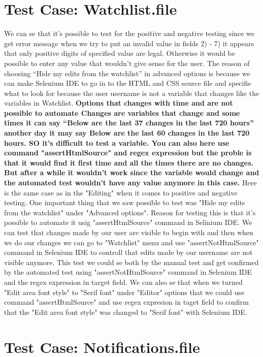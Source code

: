 \documentclass[a4paper,10pt]{article}
\begin{document}
\section*{Test Case: Watchlist.file}

We can se that it’s possible to test for the positive and negative testing since we get error message when we
try to put an invalid value in fields 2) - 7) it appears that only positive digits of specified value are legal. Otherwise
it would be possible to enter any value that wouldn’t give sense for the user. The reason of choosing “Hide my edits from the watchlist” in advanced options is because we can make Selenium IDE to go in to the HTML and CSS source file and specifie what to look for because the user 
username is not a variable that changes like the variables in Watchlist. \textbf{\color{red}Options that changes with time and are not possible to automate
Changes are variables that change and some times it can say “Below are the last 37 changes in the last 720 hours” another day it may say
Below are the last 60 changes in the last 720 hours. SO it’s difficult to test a variable. You can also here use command 
"assertHtmlSource" and regex expression but the proble is that it would find it first time and all the times there are no
changes. But after a while it wouldn't work since the variable would change and the automated test wouldn't have any
value anymore in this case.} 
Here is the same case as in the "Editing" when it comes to positive and negative testing. One important thing that
we saw possible to test was "Hide my edits from the watchlist" under "Advanced options". Reason for testing this is that it's
possible to automate it usig "assertHtmlSource" command in Selinium IDE. We can test that changes made by our user are visible 
to begin with and then when we do our changes we can go to "Watchlist" menu and use "assertNotHtmlSource" command in Selenium IDE
to controll that  edits made by our username are not visible anymore. This test we could se both by the manual test and get
confirmed by the automated test using "assertNotHtmlSource" command in Selenium IDE and the regex expression in target field.
We can also se that when we turned "Edit area font style" to "Serif font" under "Editor" options that we could use command
 "assertHtmlSource" and use regex expresion in taget field to confirm that the "Edit area font style" was changed to "Serif font" 
with Selenium IDE.


\section*{Test Case: Notifications.file}
\end{document}
